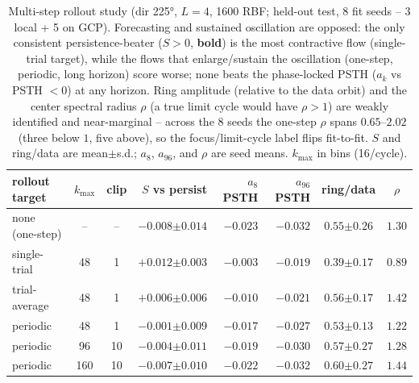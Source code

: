 \documentclass{article}
\begin{document}
\begin{table}[t]
  \centering
  \caption{Multi-step rollout study (dir \ang{225}, $L{=}4$, \num{1600} RBF; held-out test,
    \num{8} fit seeds -- 3 local + 5 on GCP). Forecasting and sustained oscillation are opposed:
    the only consistent persistence-beater ($S{>}0$, \textbf{bold}) is the most contractive flow
    (single-trial target), while the flows that enlarge/sustain the oscillation (one-step,
    periodic, long horizon) score worse; none beats the phase-locked PSTH ($a_k$ vs PSTH
    ${<}0$) at any horizon. Ring amplitude (relative to the data orbit) and the center spectral
    radius $\rho$ (a true limit cycle would have $\rho{>}1$) are weakly identified and
    near-marginal -- across the \num{8} seeds the one-step $\rho$ spans $0.65$--$2.02$ (three
    below $1$, five above), so the focus/limit-cycle label flips fit-to-fit. $S$ and ring/data are
    mean$\pm$s.d.; $a_8$, $a_{96}$, and $\rho$ are seed means. $k_{\max}$ in bins (16/cycle).}
  \label{tab:rollout}
  \begin{tabular}{lccrrrcc}
    \toprule
    rollout target & $k_{\max}$ & clip & $S$ vs persist & $a_8$ PSTH & $a_{96}$ PSTH & ring/data & $\rho$ \\
    \midrule
    none (one-step)  & --  & --  & $-0.008{\scriptstyle\pm0.014}$          & $-0.023$ & $-0.032$ & $0.55{\scriptstyle\pm0.26}$ & $1.30$ \\
    single-trial     & 48  & 1   & $\mathbf{+0.012{\scriptstyle\pm0.003}}$ & $-0.003$ & $-0.019$ & $0.39{\scriptstyle\pm0.17}$ & $0.89$ \\
    trial-average    & 48  & 1   & $+0.006{\scriptstyle\pm0.006}$          & $-0.010$ & $-0.021$ & $0.56{\scriptstyle\pm0.17}$ & $1.42$ \\
    periodic         & 48  & 1   & $-0.001{\scriptstyle\pm0.009}$          & $-0.017$ & $-0.027$ & $0.53{\scriptstyle\pm0.13}$ & $1.22$ \\
    periodic         & 96  & 10  & $-0.004{\scriptstyle\pm0.011}$          & $-0.019$ & $-0.030$ & $0.57{\scriptstyle\pm0.27}$ & $1.28$ \\
    periodic         & 160 & 10  & $-0.007{\scriptstyle\pm0.010}$          & $-0.022$ & $-0.032$ & $0.60{\scriptstyle\pm0.27}$ & $1.44$ \\
    \bottomrule
  \end{tabular}
\end{table}
\end{document}
